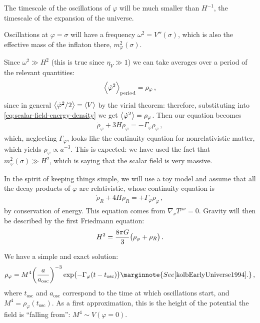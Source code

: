 \documentclass[main.tex]{subfiles}
\begin{document}
The timescale of the oscillations of \(\varphi \) will be much smaller than \(H^{-1}\), the timescale of the expansion of the universe. 

Oscillations at \(\varphi = \sigma \) will have a frequency \(\omega^2 = V''(\sigma )\), which is also the effective mass of the inflaton there, \(m^2_\varphi (\sigma )\). 

Since \(\omega^2 \gg H^2\) (this is true since \(\eta _V \gg 1\)) we can take averages over a period of the relevant quantities: 
%
\begin{align}
\expval{\dot{\varphi}^2} _{\text{period}} = \rho _\varphi 
\,,
\end{align}
%
since in general \(\expval{\dot{\varphi}^2 / 2} = \expval{V}\) by the virial theorem: therefore, substituting into \eqref{eq:scalar-field-energy-density} we get \(\expval{\dot{\varphi}^2} = \rho _\varphi \). 
Then our equation becomes 
%
\begin{align}
\dot{\rho}_\varphi + 3 H \rho _\varphi =  - \Gamma _\varphi \rho _\varphi 
\,,
\end{align}
%
which, neglecting \(\Gamma _\varphi \), looks like the continuity equation for nonrelativistic matter, which yields \(\rho _\varphi \propto a^{-3}\). 
This is expected: we have used the fact that \(m^2_\varphi (\sigma ) \gg H^2\), which is saying that the scalar field is very massive. 

In the spirit of keeping things simple, we will use a toy model and assume that all the decay products of \(\varphi \) are relativistic, whose continuity equation is 
%
\begin{align}
\dot{\rho} _R + 4 H \rho _R = + \Gamma _\varphi  \rho _\varphi 
\,,
\end{align}
%
by conservation of energy. This equation comes from \(\nabla_\nu T^{\mu \nu } = 0\). 
Gravity will then be described by the first Friedmann equation: 
%
\begin{align}
H^2 = \frac{8 \pi G}{3} \qty(\rho _\varphi + \rho _R)
\,.
\end{align}

We have a simple and exact solution: 
%
\begin{align}
\rho _\varphi = M^{4} \qty(\frac{a}{a _{\text{osc}}})^{-3} \exp(- \Gamma _\varphi \qty(t - t _{\text{osc}}))
\marginnote{See \cite[eq. 8.30]{kolbEarlyUniverse1994}.}
\,,
\end{align}
%
where \(t _{\text{osc}}\) and \(a _{\text{osc}}\) correspond to the time at which oscillations start, and \(M^{4} = \rho _\varphi ( t _{\text{osc}})\).
As a first approximation, this is the height of the potential the field is ``falling from'': \(M^{4} \sim V(\varphi = 0)\). 
\end{document}
